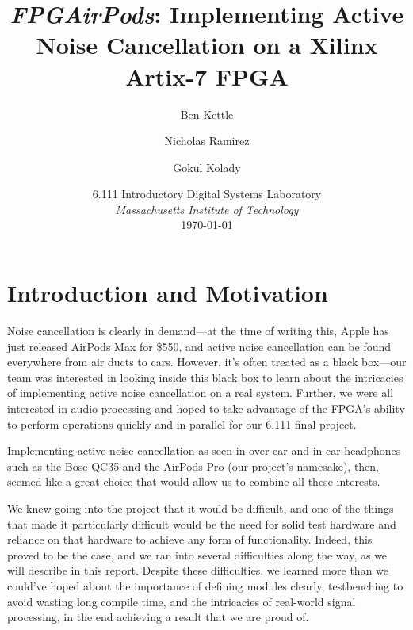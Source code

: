 \documentclass{fpgairpods}
\begin{document}
\title{\textit{FPGAirPods}: Implementing Active Noise Cancellation on a Xilinx Artix-7 FPGA}
\date{6.111 Introductory Digital Systems Laboratory \\ \textit{Massachusetts Institute of Technology} \\ \today}
\author{Ben Kettle \\  
\and Nicholas Ramirez \\  \and Gokul Kolady \\ }

\maketitle
\tableofcontents
\listoffigures

\newpage
\section{Introduction and Motivation}

Noise cancellation is clearly in demand---at the time of writing this, Apple has just released AirPods Max for \$550, and active noise cancellation can be found everywhere from air ducts to cars. However, it's often treated as a black box---our team was interested in looking inside this black box to learn about the intricacies of implementing active noise cancellation on a real system. Further, we were all interested in audio processing and hoped to take advantage of the FPGA's ability to perform operations quickly and in parallel for our 6.111 final project.

Implementing active noise cancellation as seen in over-ear and in-ear headphones such as the Bose QC35 and the AirPods Pro (our project's namesake), then, seemed like a great choice that would allow us to combine all these interests.

We knew going into the project that it would be difficult, and one of the things that made it particularly difficult would be the need for solid test hardware and reliance on that hardware to achieve any form of functionality. Indeed, this proved to be the case, and we ran into several difficulties along the way, as we will describe in this report. Despite these difficulties, we learned more than we could've hoped about the importance of defining modules clearly, testbenching to avoid wasting long compile time, and the intricacies of real-world signal processing, in the end achieving a result that we are proud of.
\end{document}
